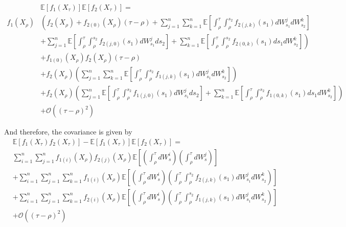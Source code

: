 \documentclass[12pt]{article}
\begin{document}
\begin{equation}
\begin{aligned}
& \mathbb{E}[f_1(X_\tau)]\mathbb{E}[f_2(X_\tau)] = \\
f_1(X_\rho) 
& \left(  f_2(X_\rho) 
 + f_{2(0)} (X_\rho) (\tau - \rho) 
 + \sum_{j=1}^n \sum_{k=1}^n \mathbb{E} \left[ \int_\rho^\tau \int_\rho^{s_2} f_{2(j,k)} (s_1) dW_{s_1}^j dW_{s_2}^k  \right] \right. \\
& \left. + \sum_{j=1}^n \mathbb{E} \left[ \int_\rho^\tau \int_\rho^{s_2} f_{2(j,0)} (s_1) dW_{s_1}^j ds_2 \right] 
 + \sum_{k=1}^n \mathbb{E} \left[ \int_\rho^\tau \int_\rho^{s_2} f_{2(0,k)} (s_1) ds_1 dW_{s_2}^k \right]\right) \\
& + f_{1(0)} (X_\rho) f_2(X_\rho) (\tau - \rho) \\
& + f_2(X_\rho) \left(  \sum_{j=1}^n \sum_{k=1}^n \mathbb{E} \left[ \int_\rho^\tau \int_\rho^{s_2} f_{1(j,k)} (s_1) dW_{s_1}^j dW_{s_2}^k  \right] \right) \\
& + f_2(X_\rho) \left(  \sum_{j=1}^n \mathbb{E} \left[ \int_\rho^\tau \int_\rho^{s_2} f_{1(j,0)} (s_1) dW_{s_1}^j ds_2 \right] 
 + \sum_{k=1}^n \mathbb{E} \left[ \int_\rho^\tau \int_\rho^{s_2} f_{1(0,k)} (s_1) ds_1 dW_{s_2}^k \right]\right) \\
& + \mathcal{O} ((\tau - \rho)^2)
\end{aligned}
\end{equation}

And therefore, the covariance is given by
\begin{equation}
\begin{aligned}
&\mathbb{E} \left[ f_1(X_\tau) f_2(X_\tau) \right] - \mathbb{E}[f_1(X_\tau)]\mathbb{E}[f_2(X_\tau)] = \\
& \sum_{i=1}^n \sum_{j=1}^n f_{1(i)} (X_\rho) f_{2(j)} (X_\rho) \mathbb{E} \left[ \left( \int_\rho^\tau dW_s^i \right) \left( \int_\rho^\tau dW_s^j \right) \right] \\
& + \sum_{i=1}^n \sum_{j=1}^n \sum_{k=1}^n f_{1(i)} (X_\rho) \mathbb{E} \left[ \left( \int_\rho^\tau dW_s^i  \right) \left( \int_\rho^\tau \int_\rho^{s_2} f_{2(j,k)} (s_1) dW_{s_1}^j dW_{s_2}^k  \right) \right] \\
& + \sum_{i=1}^n \sum_{j=1}^n \sum_{k=1}^n  f_{2(i)} (X_\rho)  \mathbb{E} \left[ \left( \int_\rho^\tau dW_s^i \right)  \left( \int_\rho^\tau \int_\rho^{s_2} f_{1(j,k)} (s_1) dW_{s_1}^j dW_{s_2}^k \right) \right] \\
&+ \mathcal{O} ((\tau - \rho)^2 ) 
\end{aligned}
\end{equation}
\end{document}
